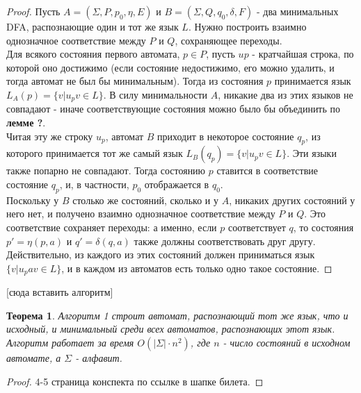 \documentclass[a4paper]{article}
\theoremstyle{indented}
\newtheorem{theorem}{Теорема}
\theoremstyle{definition}
\theoremstyle{remark}
\begin{document}
\begin{proof}
    Пусть $A = (\Sigma, P, p_0, \eta, E)$ и $B = (\Sigma, Q, q_0, \delta, F )$ - два минимальных DFA, распознающие один и тот же язык $L$. Нужно построить взаимно однозначное соответствие между $P$ и $Q$, сохраняющее переходы. \\ 

    Для всякого состояния первого автомата, $p \in P$, пусть $up$ - кратчайшая строка, по которой оно достижимо (если состояние недостижимо, его можно удалить, и тогда автомат не был бы минимальным). Тогда из состояния $p$ принимается язык $L_A(p) = \{ v | u_pv \in L \}$. В силу минимальности $A$, никакие два из этих языков не совпадают - иначе соответствующие состояния можно было бы объединить по \textbf{лемме ?}. \\ 

    Читая эту же строку $u_p$, автомат $B$ приходит в некоторое состояние $q_p$, из которого принимается тот же самый язык $L_B(q_p) = \{v | u_pv \in L\}$. Эти языки также попарно не совпадают. Тогда состоянию $p$ ставится в соответствие состояние $q_p$, и, в частности, $p_0$ отображается в $q_0$. \\ 

    Поскольку у $B$ столько же состояний, сколько и у $A$, никаких других состояний у него нет, и получено взаимно однозначное соответствие между $P$ и $Q$. Это соответствие сохраняет переходы: а именно, если $p$ соответствует $q$, то состояния $p' = \eta(p,a)$ и $q' = \delta(q,a)$ также должны соответствовать друг другу. Действительно, из каждого из этих состояний должен приниматься язык $\{ v | u_pav \in L \}$, и в каждом из автоматов есть только одно такое состояние.
\end{proof}

[сюда вставить алгоритм] \\ 

\begin{theorem}
    Алгоритм 1 строит автомат, распознающий тот же язык, что и исходный, и минимальный среди всех автоматов, распознающих этот язык. Алгоритм работает за время $O(|\Sigma| \cdot n^2)$, где $n$ - число состояний в исходном автомате, а $\Sigma$ - алфавит.
\end{theorem}

\begin{proof}
    4-5 страница конспекта по ссылке в шапке билета.
\end{proof}



\newpage 
\end{document}

